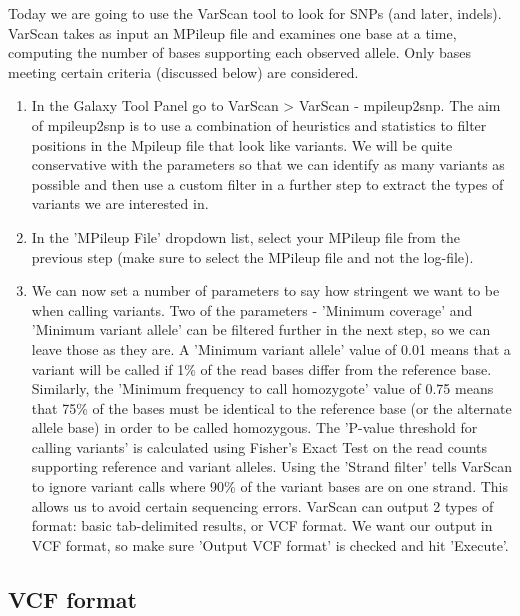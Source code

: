 \documentclass[12pt,a4paper]{article}
\begin{document}
Today we are going to use the VarScan tool to look for SNPs (and
later, indels). VarScan takes as input an MPileup file and examines
one base at a time, computing the number of bases supporting each
observed allele. Only bases meeting certain criteria (discussed below)
are considered.
\begin{enumerate}
	\item In the Galaxy Tool Panel go to VarScan > VarScan -
          mpileup2snp. The aim of mpileup2snp is to use a combination
          of heuristics and statistics to filter positions in the
          Mpileup file that look like variants. We will be quite
          conservative with the parameters so that we can identify as
          many variants as possible and then use a custom filter in a
          further step to extract the types of variants we are
          interested in.
	\item In the 'MPileup File' dropdown list, select your MPileup
          file from the previous step (make sure to select the MPileup
          file and not the log-file).
	\item We can now set a number of parameters to say how
          stringent we want to be when calling variants. Two of the
          parameters - 'Minimum coverage' and 'Minimum variant allele'
          can be filtered further in the next step, so we can leave
          those as they are. A 'Minimum variant allele' value of 0.01
          means that a variant will be called if 1\% of the read bases
          differ from the reference base. Similarly, the 'Minimum
          frequency to call homozygote' value of 0.75 means that 75\%
          of the bases must be identical to the reference base (or the
          alternate allele base) in order to be called homozygous. The
          'P-value threshold for calling variants' is calculated using
          Fisher's Exact Test on the read counts supporting reference
          and variant alleles. Using the 'Strand filter' tells VarScan
          to ignore variant calls where 90\% of the variant bases are
          on one strand. This allows us to avoid certain sequencing
          errors.
          VarScan can output 2 types of format: basic tab-delimited
          results, or VCF format. We want our output in VCF format, so
          make sure 'Output VCF format' is checked and hit 'Execute'.
\end{enumerate}

\subsection{VCF format}
\end{document}
